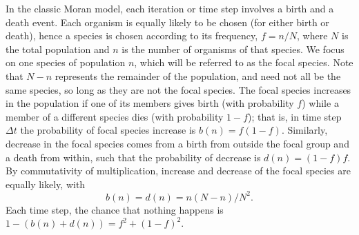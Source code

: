 \iffalse
To arrive at the Moran model we must make some assumptions.
Whether these are justified depends on the situation being regarded.
The first assumption is that no individual is better than any other; that is, whether an individual reproduces or dies is independent of its species. %
They all occupy the same niche. 
This makes the Moran model a neutral theory, and any evolution of the system comes from chance rather than from selection. 

Next we assume that the the population size is fixed, owing to the (assumed) strict competition in the system.
That is, every time there is a birth the system becomes too crowded and a death follows immediately. Alternately, upon death there is a free space in the system that is filled by a subsequent birth.
In the classic Moran model each pair of birth and death events occurs at a discrete time step (cf. the Wright-Fisher model, where each step involves $N$ of these events). %
This assumption of discrete time can be relaxed without a qualitative change in results. 


\section{Moran Model in More Detail}
\fi
In the classic Moran model, each iteration or time step involves a birth and a death event.
Each organism is equally likely to be chosen (for either birth or death), hence a species is chosen according to its frequency, $f=n/N$, where $N$ is the total population and $n$ is the number of organisms of that species.
We focus on one species of population $n$, which will be referred to as the focal species. 
Note that $N-n$ represents the remainder of the population, and need not all be the same species, so long as they are not the focal species. %
The focal species increases in the population if one of its members gives birth (with probability $f$) while a member of a different species dies (with probability $1-f$); that is, in time step $\Delta t$ the probability of focal species increase is $b(n) = f(1-f)$. 
Similarly, decrease in the focal species comes from a birth from outside the focal group and a death from within, such that the probability of decrease is $d(n) = (1-f)f$. 
By commutativity of multiplication, increase and decrease of the focal species are equally likely, with
\begin{equation}
b(n) = d(n) = n(N-n)/N^2.
\end{equation}
Each time step, the chance that nothing happens is $1-\left(b(n)+d(n)\right) = f^2 + (1-f)^2$. 

